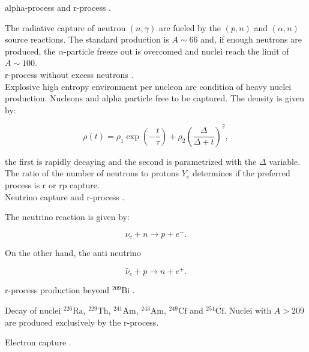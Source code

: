 \documentclass[openany]{book}
\begin{document}
alpha-process and r-process \cite{woosley_hoffman_1992}.

The radiative capture of neutron $(n, \gamma)$ are fueled by the $(p, n)$ and $(\alpha, n)$ source reactions. The standard production is $A \sim 66$ and, if enough neutrons are produced, the $\alpha$-particle freeze out is overcomed and nuclei reach the limit of $A \sim 100$. \\

r-process without excess neutrons \cite{meyer_2002}. \\

Explosive high entropy environment per nucleon are condition of heavy nuclei production. Nucleons and alpha particle free to be captured. The density is given by: 

\begin{equation}\label{eq:reaction_density}
	\rho(t) = \rho_1 \exp \left( - \frac{t}{\tau}\right) + \rho_2 \left( \frac{\Delta}{\Delta + t}\right)^2,
\end{equation}

the first is rapidly decaying and the second is parametrized with the $\Delta$ variable. \\

The ratio of the number of neutrons to protons $Y_e$ determines if the preferred process is r or rp capture. \\

Neutrino capture and r-process \cite{meyer_mclaughlin_fuller_1998}.

The neutrino reaction is given by: 

\begin{equation}\label{eq:reaction_neutrino_ne}
	\nu_e + n \rightarrow p + e^{-}.
\end{equation}

On the other hand, the anti neutrino 

\begin{equation}\label{eq:reaction_antineutrino_hatne}
	\hat {\nu}_{e} + p \rightarrow n + e^{+}.
\end{equation}

r-process production beyond $\mathrm{{}^{209}Bi}$ \cite{qian_vogel_wasserburg_1999}.

Decay of nuclei $\mathrm{{}^{226}Ra}$,  $\mathrm{{}^{229}Th}$, $\mathrm{{}^{241}Am}$, $\mathrm{{}^{243}Am}$, $\mathrm{{}^{249}Cf}$ and $\mathrm{{}^{251}Cf}$. Nuclei with $A>209$ are produced exclusively by the r-process.

Electron capture \cite{langanke_martinez-pinedo_zegers_2021}. \\
\end{document}
